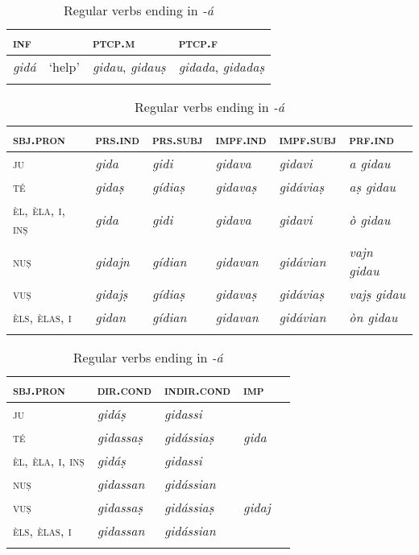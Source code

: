 \begin{table}
	\caption{Regular verbs ending in \textit{-á}}
	\label{conja}
	\begin{tabularx}{.7\textwidth}{llll}
		
		\lsptoprule
		\textsc{inf} & & \textsc{ptcp.m}  & \textsc{ptcp.f}\\
		\midrule
		\textit{gidá} & `help' & \textit{gidau}, \textit{gidauṣ} & \textit{gidada}, \textit{gidadaṣ}\\
		\lspbottomrule  
	\end{tabularx}
	
	\medskip
	
	\begin{tabularx}{\textwidth}{p{2cm}lllll}
		\lsptoprule
		\textsc{sbj.pron} &\textsc{prs.ind} &\textsc{prs.subj} &\textsc{impf.ind} & \textsc{impf.subj} &\textsc{prf.ind}\\
		\midrule
		\textsc{ju} & \textit{gida} & \textit{gidi} & \textit{gidava} & \textit{gidavi} & \textit{a gidau}  \\
		\textsc{té} & \textit{gidaṣ} & \textit{gídiaṣ} & \textit{gidavaṣ} & \textit{gidáviaṣ} & \textit{aṣ gidau}\\
		\textsc{èl, èla, i, inṣ} & \textit{gida} & \textit{gidi} & \textit{gidava} & \textit{gidavi}  & \textit{ò gidau} \\
		\textsc{nuṣ} & \textit{gidajn} & \textit{gídian} & \textit{gidavan} & \textit{gidávian} & \textit{vajn gidau} \\
		\textsc{vuṣ} & \textit{gidajṣ} & \textit{gídiaṣ} & \textit{gidavaṣ}  & \textit{gidáviaṣ} & \textit{vajṣ gidau} \\
		\textsc{èls, èlas, i} & \textit{gidan}  & \textit{gídian} & \textit{gidavan} & \textit{gidávian} & \textit{òn gidau}\\
		\lspbottomrule
	\end{tabularx}
	
	\medskip
	
	\begin{tabularx} {\textwidth}{p{2cm}XXXX}
		\lsptoprule
		\textsc{sbj.pron} &\textsc{dir.cond} &  \textsc{indir.cond} & \textsc{imp}\\
		\midrule
		\textsc{ju} & \textit{gidáṣ} & \textit{gidassi}\\
		\textsc{té} & \textit{gidassaṣ} & \textit{gidássiaṣ} & \textit{gida}\\
		\textsc{èl, èla, i, inṣ} & \textit{gidáṣ} &  \textit{gidassi}\\
		\textsc{nuṣ} & \textit{gidassan} & \textit{gidássian}\\
		\textsc{vuṣ} & \textit{gidassaṣ} & \textit{gidássiaṣ}  & \textit{gidaj}\\
		\textsc{èls, èlas, i} & \textit{gidassan}  & \textit{gidássian} \\
		\lspbottomrule
	\end{tabularx} 
\end{table}



